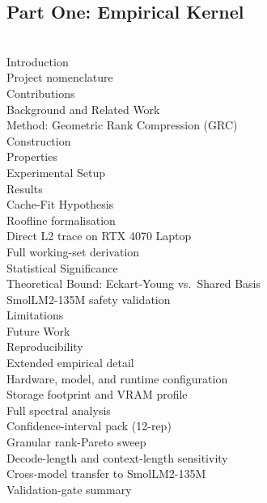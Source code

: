 \documentclass[11pt]{article}
\begin{document}
\subsection*{Part One: Empirical Kernel}

\\
\quad Introduction\\
\quad \quad Project nomenclature\\
\quad \quad Contributions\\
\quad Background and Related Work\\
\quad Method: Geometric Rank Compression (GRC)\\
\quad \quad Construction\\
\quad \quad Properties\\
\quad Experimental Setup\\
\quad Results\\
\quad Cache-Fit Hypothesis\\
\quad \quad Roofline formalisation\\
\quad \quad Direct L2 trace on RTX 4070 Laptop\\
\quad \quad Full working-set derivation\\
\quad Statistical Significance\\
\quad Theoretical Bound: Eckart-Young vs.\ Shared Basis\\
\quad \quad SmolLM2-135M safety validation\\
\quad Limitations\\
\quad Future Work\\
\quad Reproducibility\\
\quad Extended empirical detail\\
\quad \quad Hardware, model, and runtime configuration\\
\quad \quad Storage footprint and VRAM profile\\
\quad \quad Full spectral analysis\\
\quad \quad Confidence-interval pack (12-rep)\\
\quad \quad Granular rank-Pareto sweep\\
\quad \quad Decode-length and context-length sensitivity\\
\quad \quad Cross-model transfer to SmolLM2-135M\\
\quad \quad Validation-gate summary\\
\end{document}
